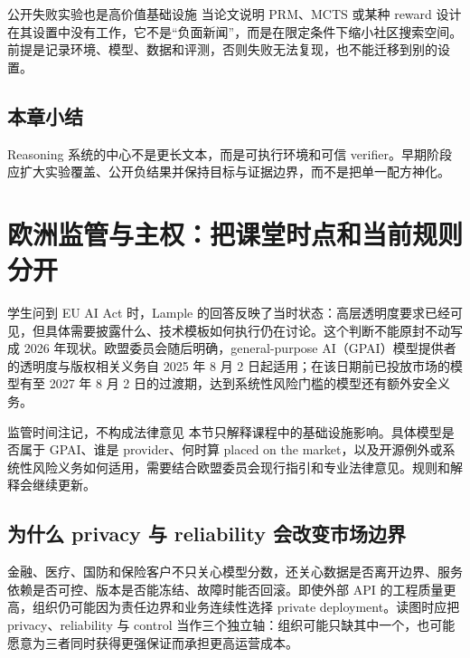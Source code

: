 \documentclass[a4paper]{article}
\begin{document}
\begin{warningbox}{公开失败实验也是高价值基础设施}
当论文说明 PRM、MCTS 或某种 reward 设计在其设置中没有工作，它不是“负面新闻”，而是在限定条件下缩小社区搜索空间。前提是记录环境、模型、数据和评测，否则失败无法复现，也不能迁移到别的设置。
\end{warningbox}


\subsection{本章小结}

Reasoning 系统的中心不是更长文本，而是可执行环境和可信 verifier。早期阶段应扩大实验覆盖、公开负结果并保持目标与证据边界，而不是把单一配方神化。

\section{欧洲监管与主权：把课堂时点和当前规则分开}

学生问到 EU AI Act 时，Lample 的回答反映了当时状态：高层透明度要求已经可见，但具体需要披露什么、技术模板如何执行仍在讨论。这个判断不能原封不动写成 2026 年现状。欧盟委员会随后明确，general-purpose AI（GPAI）模型提供者的透明度与版权相关义务自 2025 年 8 月 2 日起适用；在该日期前已投放市场的模型有至 2027 年 8 月 2 日的过渡期，达到系统性风险门槛的模型还有额外安全义务。

\begin{warningbox}{监管时间注记，不构成法律意见}
本节只解释课程中的基础设施影响。具体模型是否属于 GPAI、谁是 provider、何时算 placed on the market，以及开源例外或系统性风险义务如何适用，需要结合欧盟委员会现行指引和专业法律意见。规则和解释会继续更新。
\end{warningbox}

\subsection{为什么 privacy 与 reliability 会改变市场边界}

金融、医疗、国防和保险客户不只关心模型分数，还关心数据是否离开边界、服务依赖是否可控、版本是否能冻结、故障时能否回滚。即使外部 API 的工程质量更高，组织仍可能因为责任边界和业务连续性选择 private deployment。读图时应把 privacy、reliability 与 control 当作三个独立轴：组织可能只缺其中一个，也可能愿意为三者同时获得更强保证而承担更高运营成本。
\end{document}
